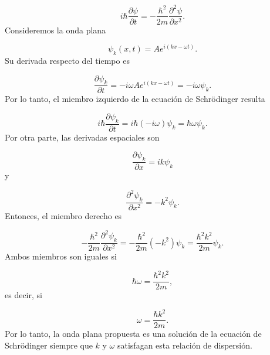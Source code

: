 \documentclass[12pt,a4paper]{article}
\begin{document}
	\[
	i\hbar\frac{\partial\psi}{\partial t}
	=
	-\frac{\hbar^2}{2m}\frac{\partial^2\psi}{\partial x^2}.
	\]
	Consideremos la onda plana
	
	\[
	\psi_k(x,t)=Ae^{i(kx-\omega t)}.
	\]
	Su derivada respecto del tiempo es
	
	\[
	\frac{\partial\psi_k}{\partial t}
	=
	-i\omega Ae^{i(kx-\omega t)}
	=
	-i\omega\psi_k.
	\]
	Por lo tanto, el miembro izquierdo de la ecuación de Schrödinger resulta
	
	\[
	i\hbar\frac{\partial\psi_k}{\partial t}
	=
	i\hbar(-i\omega)\psi_k
	=
	\hbar\omega\psi_k.
	\]
	Por otra parte, las derivadas espaciales son
	
	\[
	\frac{\partial\psi_k}{\partial x}
	=
	ik\psi_k
	\]
	y
	
	\[
	\frac{\partial^2\psi_k}{\partial x^2}
	=
	-k^2\psi_k.
	\]
	Entonces, el miembro derecho es
	
	\[
	-\frac{\hbar^2}{2m}\frac{\partial^2\psi_k}{\partial x^2}
	=
	-\frac{\hbar^2}{2m}(-k^2)\psi_k
	=
	\frac{\hbar^2k^2}{2m}\psi_k.
	\]
	Ambos miembros son iguales si
	
	\[
	\hbar\omega
	=
	\frac{\hbar^2k^2}{2m},
	\]
	es decir, si
	
	\[
	\omega=\frac{\hbar k^2}{2m}.
	\]
	Por lo tanto, la onda plana propuesta es una solución de la ecuación de Schrödinger siempre que \(k\) y \(\omega\) satisfagan esta relación de dispersión.
\end{document}

